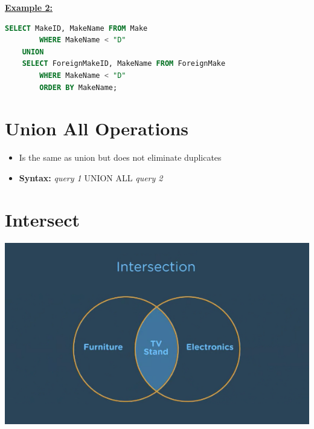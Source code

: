 \documentclass[12pt]{article}
\begin{document}
\begin{itemize}
    \bigskip

    \underline{\textbf{Example 2:}}

    \bigskip

    \begin{lstlisting}[language=SQL]
    SELECT MakeID, MakeName FROM Make
        WHERE MakeName < "D"
    UNION
    SELECT ForeignMakeID, MakeName FROM ForeignMake
        WHERE MakeName < "D"
        ORDER BY MakeName;
    \end{lstlisting}

\end{itemize}

\bigskip

\section{Union All Operations}

\bigskip

\begin{itemize}
    \item Is the same as union but does not eliminate duplicates
    \item \textbf{Syntax:} \textit{query 1} UNION ALL \textit{query 2}
\end{itemize}

\bigskip

\section{Intersect}

\bigskip

\begin{center}
\includegraphics[width=0.8\linewidth]{images/part_5_notes_3.png}
\end{center}
\end{document}
